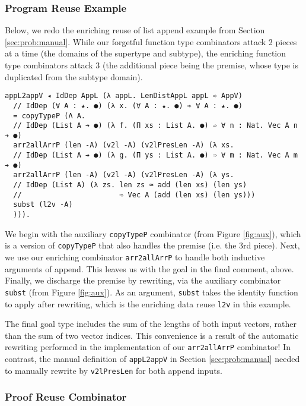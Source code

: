 \documentclass[acmsmall]{acmart}\settopmatter{}
\newcommand{\refsec}[1]{Section \ref{sec:#1}}
\newcommand{\reffig}[1]{Figure \ref{fig:#1}}
\begin{document}
\subsubsection{Program Reuse Example}

Below, we redo the enriching reuse of list append example from
\refsec{prob:manual}. While our forgetful function type combinators
attack 2 pieces at a time (the domains of the supertype and subtype),
the enriching function type combinators attack 3 (the additional piece
being the premise, whose type is duplicated from the subtype domain).

\begin{verbatim}
appL2appV ◂ IdDep AppL (λ appL. LenDistAppL appL ➾ AppV)
  // IdDep (∀ A : ★. ●) (λ x. (∀ A : ★. ●) ➾ ∀ A : ★. ●)
  = copyTypeP (Λ A.
  // IdDep (List A ➔ ●) (λ f. (Π xs : List A. ●) ➾ ∀ n : Nat. Vec A n ➔ ●)
  arr2allArrP (len -A) (v2l -A) (v2lPresLen -A) (λ xs.
  // IdDep (List A ➔ ●) (λ g. (Π ys : List A. ●) ➾ ∀ m : Nat. Vec A m ➔ ●)
  arr2allArrP (len -A) (v2l -A) (v2lPresLen -A) (λ ys.
  // IdDep (List A) (λ zs. len zs ≃ add (len xs) (len ys)
  //                       ➾ Vec A (add (len xs) (len ys)))
  subst (l2v -A)
  ))).
\end{verbatim}

We begin with the auxiliary \verb;copyTypeP; combinator
(from \reffig{aux}), which is a version of \verb;copyTypeP; that also handles
the premise (i.e. the 3rd piece). Next, we use our enriching
combinator \verb;arr2allArrP; to handle both inductive arguments of
append. This leaves us with the goal in the final comment,
above. Finally, we discharge the premise by rewriting, via the auxiliary
combinator \verb;subst; (from \reffig{aux}). As an argument,
\verb;subst; takes the identity function to apply after rewriting,
which is the enriching data reuse \verb;l2v; in this example.

The final goal type includes the sum of the lengths of both input
vectors, rather than the sum of two vector indices.
This convenience is a result
of the automatic rewriting performed in the implementation of our
\verb;arr2allArrP; combinator! In contrast, the manual definition of
\verb;appL2appV; in \refsec{prob:manual} needed to manually rewrite
by \verb;v2lPresLen; for both append inputs.

\subsubsection{Proof Reuse Combinator}
\end{document}
